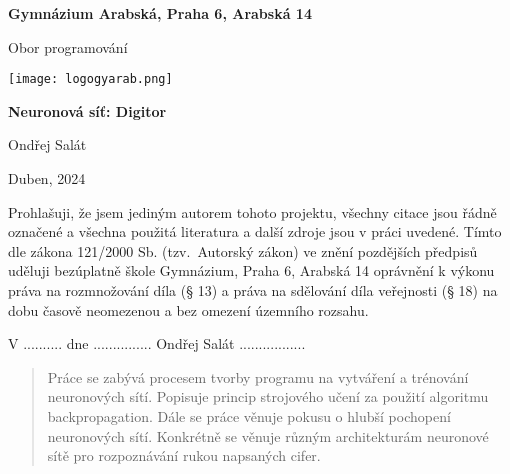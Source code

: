 \begin{titlepage}
    \begin{center}
        \large \vspace*{\fill}
        \thispagestyle{empty}

        \LARGE

        { \huge \textbf{Gymnázium Arabská, Praha 6, Arabská 14}}

        {\LARGE Obor programování }

        \vfill
        \texttt{[image: logogyarab.png]}
        \vspace{15pt}

        \vfill

        {\huge \textbf{Neuronová síť: Digitor}}

        \vfill

        Ondřej Salát

        \vfill

        {\large Duben, 2024}

        \vspace*{\fill}
    \end{center}
\end{titlepage}

\thispagestyle{empty}
\addtocounter{page}{-1}
\vspace*{\fill}
Prohlašuji, že jsem jediným autorem tohoto projektu, všechny citace jsou řádně označené a všechna
použitá literatura a další zdroje jsou v práci uvedené.
Tímto dle zákona 121/2000 Sb. (tzv.\ Autorský zákon)
ve znění pozdějších předpisů uděluji bezúplatně škole Gymnázium, Praha 6, Arabská 14 oprávnění k výkonu
práva na rozmnožování díla (§ 13) a práva na sdělování díla veřejnosti (§ 18) na dobu časově neomezenou a
bez omezení územního rozsahu.

\vspace{2cm}
V .......... dne ............... \hspace{4cm} Ondřej Salát .................

\vspace{2cm}

\newpage
\begin{abstract}
    Práce se zabývá procesem tvorby programu na vytváření a trénování neuronových sítí.
    Popisuje princip strojového učení za použití algoritmu backpropagation.
    Dále se práce věnuje pokusu o hlubší pochopení neuronových sítí.
    Konkrétně se věnuje různým architekturám neuronové sítě pro rozpoznávání rukou napsaných cifer.
\end{abstract}

\tableofcontents